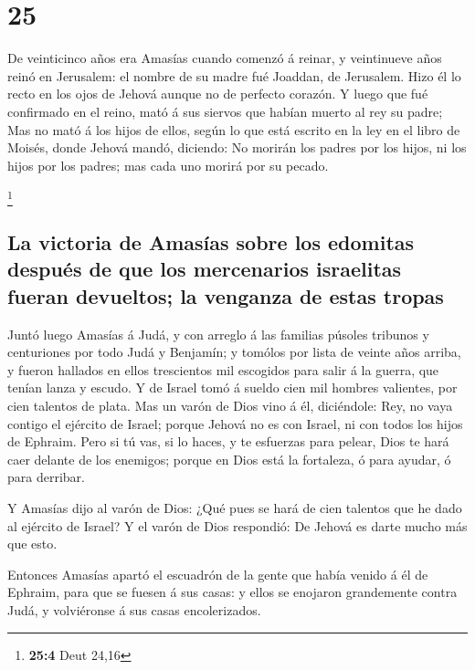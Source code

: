 \hypertarget{section-24}{%
\section{25}\label{section-24}}

 De veinticinco años era Amasías cuando comenzó á reinar, y
veintinueve años reinó en Jerusalem: el nombre de su madre fué Joaddan,
de Jerusalem.  Hizo él lo recto en los ojos de Jehová aunque
no de perfecto corazón.  Y luego que fué confirmado en el
reino, mató á sus siervos que habían muerto al rey su padre;
 Mas no mató á los hijos de ellos, según lo que está escrito
en la ley en el libro de Moisés, donde Jehová mandó, diciendo: No
morirán los padres por los hijos, ni los hijos por los padres; mas cada
uno morirá por su pecado.

\footnote{\textbf{25:4} Deut 24,16}

\hypertarget{la-victoria-de-amasuxedas-sobre-los-edomitas-despuuxe9s-de-que-los-mercenarios-israelitas-fueran-devueltos-la-venganza-de-estas-tropas}{%
\subsection{La victoria de Amasías sobre los edomitas después de que los
mercenarios israelitas fueran devueltos; la venganza de estas
tropas}\label{la-victoria-de-amasuxedas-sobre-los-edomitas-despuuxe9s-de-que-los-mercenarios-israelitas-fueran-devueltos-la-venganza-de-estas-tropas}}

 Juntó luego Amasías á Judá, y con arreglo á las familias
púsoles tribunos y centuriones por todo Judá y Benjamín; y tomólos por
lista de veinte años arriba, y fueron hallados en ellos trescientos mil
escogidos para salir á la guerra, que tenían lanza y escudo.
 Y de Israel tomó á sueldo cien mil hombres valientes, por
cien talentos de plata.  Mas un varón de Dios vino á él,
diciéndole: Rey, no vaya contigo el ejército de Israel; porque Jehová no
es con Israel, ni con todos los hijos de Ephraim.  Pero si
tú vas, si lo haces, y te esfuerzas para pelear, Dios te hará caer
delante de los enemigos; porque en Dios está la fortaleza, ó para
ayudar, ó para derribar.

 Y Amasías dijo al varón de Dios: ¿Qué pues se hará de cien
talentos que he dado al ejército de Israel? Y el varón de Dios
respondió: De Jehová es darte mucho más que esto.

 Entonces Amasías apartó el escuadrón de la gente que había
venido á él de Ephraim, para que se fuesen á sus casas: y ellos se
enojaron grandemente contra Judá, y volviéronse á sus casas
encolerizados.

